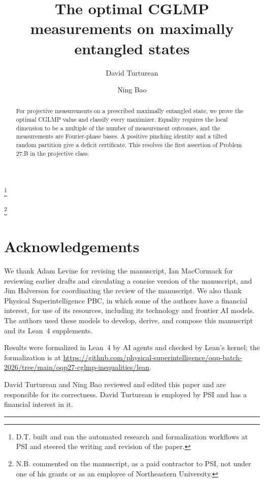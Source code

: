 \documentclass[aps,prl,reprint,superscriptaddress,longbibliography,floatfix,raggedbottom]{revtex4-2}
\begin{document}
\title{The optimal CGLMP measurements on maximally entangled states}
\author{David Turturean}\thanks{D.T. built and ran the automated research and formalization workflows at PSI and steered the writing and revision of the paper.}
\author{Ning Bao}\thanks{N.B. commented on the manuscript, as a paid contractor to PSI, not under one of his grants or as an employee of Northeastern University.}

\begin{abstract}
For projective measurements on a prescribed maximally entangled state,
we prove the optimal CGLMP value and classify every maximizer. Equality
requires the local dimension to be a multiple of the number of measurement outcomes, and
the measurements are Fourier-phase bases.
A positive pinching identity and a tilted random partition give a deficit
certificate.
This resolves the first assertion of Problem 27.B in the projective class.
\end{abstract}

\maketitle

{\raggedright\setlength{\parskip}{0.4\baselineskip}
\section*{Acknowledgements}

We thank Adam Levine for revising the manuscript, Ian MacCormack for reviewing earlier drafts and circulating a concise version of the manuscript, and Jim Halverson for coordinating the review of the manuscript. We also thank Physical Superintelligence PBC, in which some of the authors have a financial interest, for use of its resources, including its technology and frontier AI models. The authors used these models to develop, derive, and compose this manuscript and its Lean~4 supplements.

Results were formalized in Lean~4 by AI agents and checked by Lean's kernel; the formalization is at \url{https://github.com/physical-superintelligence/oqp-batch-2026/tree/main/oqp27-cglmp-inequalities/lean}.

David Turturean and Ning Bao reviewed and edited this paper and are responsible for its correctness. David Turturean is employed by PSI and has a financial interest in it.

\par}
\par\medskip\noindent\rule{\columnwidth}{0.4pt}\par\medskip
\end{document}
